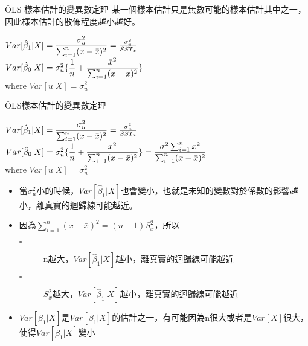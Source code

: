 \documentclass[xcolor=dvipsnames]{beamer}
\begin{document}
\begin{frame}{\H OLS 樣本估計的變異數定理}
某一個樣本估計只是無數可能的樣本估計其中之一，因此樣本估計的散佈程度越小越好。
\begin{theorem}

$Var[\hat{\beta}_{1}|X]=\mathlarger{\frac{\sigma_{u}^{2}}{\sum_{i=1}^{n}(x-\bar{x})^2}}=\frac{\sigma_{u}^{2}}{SST_{x}}$\\
$Var[\hat{\beta}_{0}|X]=\sigma_{u}^{2}\mathlarger{\{\frac{1}{n}+\frac{\bar{x}^2}{\sum_{i=1}^{n}(x-\bar{x})^2}}\}$\\
$\mathrm{where}$ $Var[u|X]=\sigma_{u}^{2}$
\end{theorem}
\end{frame}
\begin{frame}{\H OLS樣本估計的變異數定理}
\begin{Theorem}
$Var[\hat{\beta}_{1}|X]=\mathlarger{\frac{\sigma_{u}^{2}}{\sum_{i=1}^{n}(x-\bar{x})^2}}=\frac{\sigma_{u}^{2}}{SST_{x}}$\\
$Var[\hat{\beta}_{0}|X]=\sigma_{u}^{2}\mathlarger{\{\frac{1}{n}+\frac{\bar{x}^2}{\sum_{i=1}^{n}(x-\bar{x})^2}}\}=\mathlarger{\frac{\sigma^2\sum_{i=1}^{n}x^2}{\sum_{i=1}^{n}(x-\bar{x})^2}}$\\
$\mathrm{where}$ $Var[u|X]=\sigma_{u}^{2}$
\end{Theorem}
\begin{itemize}
\item 當$\sigma_{u}^{2}$小的時候，$Var[\hat{\beta}_{1}|X]$也會變小，也就是未知的變數對於係數的影響越小，離真實的迴歸線可能越近。
\item 因為$\sum_{i=1}^{n}(x-\bar{x})^2=(n-1)S_{x}^{2} $，所以
\begin{description}
\item [$ \square $]n越大，$Var[\hat{\beta}_{1}|X]$越小，離真實的迴歸線可能越近
\item [$\square  $]$ S_{x}^{2} $越大，$Var[\hat{\beta}_{1}|X]$越小，離真實的迴歸線可能越近
\end{description}
\item $Var[\hat{\beta}_{1}|X]$是$Var[\beta_{1}|X]$的估計之一，有可能因為n很大或者是$ Var[X] $很大，使得$Var[\hat{\beta}_{1}|X]$變小
\end{itemize}
\end{frame}
\end{document}
